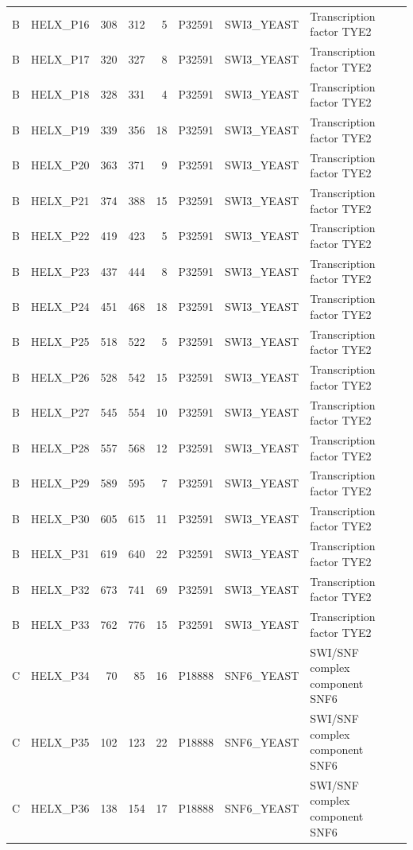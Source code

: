 \begin{longtable}{@{}llrrrrllp{5.2cm}@{}}
  B & HELX_P16 & 308 & 312 & 5 & P32591 & SWI3_YEAST & Transcription factor TYE2 \\
  B & HELX_P17 & 320 & 327 & 8 & P32591 & SWI3_YEAST & Transcription factor TYE2 \\
  B & HELX_P18 & 328 & 331 & 4 & P32591 & SWI3_YEAST & Transcription factor TYE2 \\
  B & HELX_P19 & 339 & 356 & 18 & P32591 & SWI3_YEAST & Transcription factor TYE2 \\
  B & HELX_P20 & 363 & 371 & 9 & P32591 & SWI3_YEAST & Transcription factor TYE2 \\
  B & HELX_P21 & 374 & 388 & 15 & P32591 & SWI3_YEAST & Transcription factor TYE2 \\
  B & HELX_P22 & 419 & 423 & 5 & P32591 & SWI3_YEAST & Transcription factor TYE2 \\
  B & HELX_P23 & 437 & 444 & 8 & P32591 & SWI3_YEAST & Transcription factor TYE2 \\
  B & HELX_P24 & 451 & 468 & 18 & P32591 & SWI3_YEAST & Transcription factor TYE2 \\
  B & HELX_P25 & 518 & 522 & 5 & P32591 & SWI3_YEAST & Transcription factor TYE2 \\
  B & HELX_P26 & 528 & 542 & 15 & P32591 & SWI3_YEAST & Transcription factor TYE2 \\
  B & HELX_P27 & 545 & 554 & 10 & P32591 & SWI3_YEAST & Transcription factor TYE2 \\
  B & HELX_P28 & 557 & 568 & 12 & P32591 & SWI3_YEAST & Transcription factor TYE2 \\
  B & HELX_P29 & 589 & 595 & 7 & P32591 & SWI3_YEAST & Transcription factor TYE2 \\
  B & HELX_P30 & 605 & 615 & 11 & P32591 & SWI3_YEAST & Transcription factor TYE2 \\
  B & HELX_P31 & 619 & 640 & 22 & P32591 & SWI3_YEAST & Transcription factor TYE2 \\
  B & HELX_P32 & 673 & 741 & 69 & P32591 & SWI3_YEAST & Transcription factor TYE2 \\
  B & HELX_P33 & 762 & 776 & 15 & P32591 & SWI3_YEAST & Transcription factor TYE2 \\
  C & HELX_P34 & 70 & 85 & 16 & P18888 & SNF6_YEAST & SWI/SNF complex component SNF6 \\
  C & HELX_P35 & 102 & 123 & 22 & P18888 & SNF6_YEAST & SWI/SNF complex component SNF6 \\
  C & HELX_P36 & 138 & 154 & 17 & P18888 & SNF6_YEAST & SWI/SNF complex component SNF6 \\

\end{longtable}
